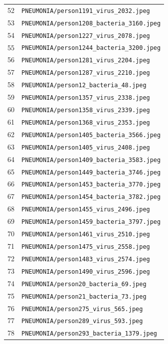 \begin{longtable}{r p{12cm}}
52 & \texttt{PNEUMONIA/person1191\_virus\_2032.jpeg} \\
53 & \texttt{PNEUMONIA/person1208\_bacteria\_3160.jpeg} \\
54 & \texttt{PNEUMONIA/person1227\_virus\_2078.jpeg} \\
55 & \texttt{PNEUMONIA/person1244\_bacteria\_3200.jpeg} \\
56 & \texttt{PNEUMONIA/person1281\_virus\_2204.jpeg} \\
57 & \texttt{PNEUMONIA/person1287\_virus\_2210.jpeg} \\
58 & \texttt{PNEUMONIA/person12\_bacteria\_48.jpeg} \\
59 & \texttt{PNEUMONIA/person1357\_virus\_2338.jpeg} \\
60 & \texttt{PNEUMONIA/person1358\_virus\_2339.jpeg} \\
61 & \texttt{PNEUMONIA/person1368\_virus\_2353.jpeg} \\
62 & \texttt{PNEUMONIA/person1405\_bacteria\_3566.jpeg} \\
63 & \texttt{PNEUMONIA/person1405\_virus\_2408.jpeg} \\
64 & \texttt{PNEUMONIA/person1409\_bacteria\_3583.jpeg} \\
65 & \texttt{PNEUMONIA/person1449\_bacteria\_3746.jpeg} \\
66 & \texttt{PNEUMONIA/person1453\_bacteria\_3770.jpeg} \\
67 & \texttt{PNEUMONIA/person1454\_bacteria\_3782.jpeg} \\
68 & \texttt{PNEUMONIA/person1455\_virus\_2496.jpeg} \\
69 & \texttt{PNEUMONIA/person1459\_bacteria\_3797.jpeg} \\
70 & \texttt{PNEUMONIA/person1461\_virus\_2510.jpeg} \\
71 & \texttt{PNEUMONIA/person1475\_virus\_2558.jpeg} \\
72 & \texttt{PNEUMONIA/person1483\_virus\_2574.jpeg} \\
73 & \texttt{PNEUMONIA/person1490\_virus\_2596.jpeg} \\
74 & \texttt{PNEUMONIA/person20\_bacteria\_69.jpeg} \\
75 & \texttt{PNEUMONIA/person21\_bacteria\_73.jpeg} \\
76 & \texttt{PNEUMONIA/person275\_virus\_565.jpeg} \\
77 & \texttt{PNEUMONIA/person289\_virus\_593.jpeg} \\
78 & \texttt{PNEUMONIA/person293\_bacteria\_1379.jpeg} \\

\end{longtable}
